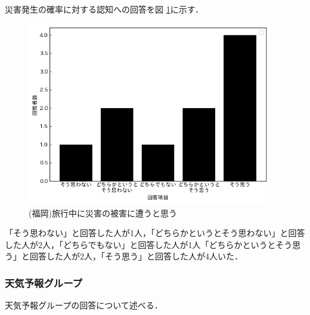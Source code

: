 災害発生の確率に対する認知への回答を図 \ref{fig:system_fukuoka_2}に示す．
\begin{figure}[H]
  \centering
  \includegraphics[height=8cm]{./fig/system_fukuoka_2.png}
  \caption{(福岡)旅行中に災害の被害に遭うと思う}
  \label{fig:system_fukuoka_2}
\end{figure}
「そう思わない」と回答した人が1人，「どちらかというとそう思わない」と回答した人が2人，「どちらでもない」と回答した人が1人「どちらかというとそう思う」と回答した人が2人，「そう思う」と回答した人が4人いた．

\subsubsection{天気予報グループ}
天気予報グループの回答について述べる．

